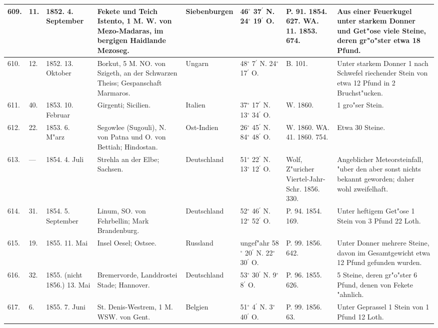\documentclass[a4paper, 8pt, oneside, polutonikogreek, german]{article}
\begin{document}
\begin{center}
\begin{longtable}{| p{5mm} | p{3mm} | p{15mm} | p{25mm} | p{20mm} | p{14mm} | p{17mm} | p{24mm} |}
        609. & 11. & 1852. 4. September & Fekete und Teich Istento, 1 M. W. von Mezo-Madaras, im bergigen Haidlande Mezoseg. & Siebenburgen & 46$^\circ$ 37$^\prime$ N. 24$^\circ$ 19$^\prime$ O. & P. 91. 1854. 627. WA. 11. 1853. 674. & Aus einer Feuerkugel unter starkem Donner und Get"ose viele Steine, deren gr"o"ster etwa 18 Pfund. \\ \hline
        610. & 12. & 1852. 13. Oktober & Borkut, 5 M. NO. von Szigeth, an der Schwarzen Theiss; Gespanschaft Marmaros. & Ungarn & 48$^\circ$ 7$^\prime$ N. 24$^\circ$ 17$^\prime$ O. & B. 101. & Unter starkem Donner 1 nach Schwefel riechender Stein von etwa 12 Pfund in 2 Bruchst"ucken. \\ \hline
        611. & 40. & 1853. 10. Februar & Girgenti; Sicilien. & Italien & 37$^\circ$ 17$^\prime$ N. 13$^\circ$ 34$^\prime$ O. & W. 1860. & 1 gro"ser Stein. \\ \hline
        612. & 22. & 1853. 6. M"arz & Segowlee (Sugouli), N. von Patna und O. von Bettiah; Hindostan. & Ost-Indien & 26$^\circ$ 45$^\prime$ N. 84$^\circ$ 48$^\prime$ O. & W. 1860. WA. 41. 1860. 754. & Etwa 30 Steine. \\ \hline
        613. & --- & 1854. 4. Juli & Strehla an der Elbe; Sachsen. & Deutschland & 51$^\circ$ 22$^\prime$ N. 13$^\circ$ 12$^\prime$ O. & Wolf, Z"uricher Viertel-Jahr-Schr. 1856. 330. & Angeblicher Meteorsteinfall, "uber den aber sonst nichts bekannt geworden; daher wohl zweifelhaft. \\ \hline
        614. & 31. & 1854. 5. September & Linum, SO. von Fehrbellin; Mark Brandenburg. & Deutschland & 52$^\circ$ 46$^\prime$ N. 12$^\circ$ 52$^\prime$ O. & P. 94. 1854. 169. & Unter heftigem Get"ose 1 Stein von 3 Pfund 22 Loth. \\ \hline
        615. & 19. & 1855. 11. Mai & Insel Oesel; Ostsee. & Russland & ungef"ahr 58$^\circ$ 20$^\prime$ N. 22$^\circ$ 30$^\prime$ O. & P. 99. 1856. 642. & Unter Donner mehrere Steine, davon im Gesamtgewicht etwa 12 Pfund gefunden wurden. \\ \hline
        616. & 32. & 1855. (nicht 1856.) 13. Mai & Bremervorde, Landdrostei Stade; Hannover. & Deutschland & 53$^\circ$ 30$^\prime$ N. 9$^\circ$ 8$^\prime$ O. & P. 96. 1855. 626. & 5 Steine, deren gr"o"ster 6 Pfund, denen von Fekete "ahnlich. \\ \hline
        617. & 6. & 1855. 7. Juni & St. Denis-Westrem, 1 M. WSW. von Gent. & Belgien & 51$^\circ$ 4$^\prime$ N. 3$^\circ$ 40$^\prime$ O. & P. 99. 1856. 63. & Unter Geprassel 1 Stein von 1 Pfund 12 Loth. \\ \hline

\end{longtable}
\end{center}
\end{document}
